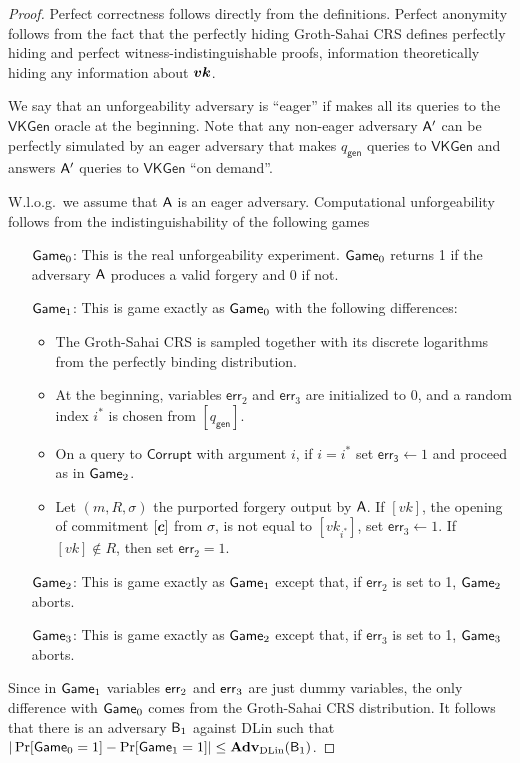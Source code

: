 \begin{proof}
Perfect correctness follows directly from the definitions. Perfect anonymity follows from the fact that the perfectly hiding Groth-Sahai CRS defines perfectly hiding and perfect witness-indistinguishable proofs, information theoretically hiding any information about ${\boldsymbol{vk}}$.

We say that an unforgeability adversary is ``eager'' if  makes all its queries to the $\mathsf{VKGen}$ oracle at the beginning. Note that any non-eager adversary $\mathsf{A}'$ can be perfectly simulated  by an eager adversary that makes ${q_\mathsf{gen}}$ queries to $\mathsf{VKGen}$ and answers $\mathsf{A}'$ queries to $\mathsf{VKGen}$ ``on demand''.

W.l.o.g.~we assume that $\mathsf{A}$ is an eager adversary. Computational unforgeability follows from the indistinguishability of the following games
\begin{itemize}
\item[$\mathsf{Game}_0$:] This is the real unforgeability experiment. $\mathsf{Game}_0$ returns 1 if the adversary $\mathsf{A}$ produces a valid forgery and 0 if not.
\item[$\mathsf{Game}_1$:] This is game exactly as $\mathsf{Game}_0$ with the following differences: 
    \begin{itemize}
    \item The Groth-Sahai CRS is sampled together with its discrete logarithms from the perfectly binding distribution.
    \item At the beginning, variables $\mathsf{err}_2$ and $\mathsf{err}_3$ are initialized to $0$, and a random index $i^*$ is chosen from $[{q_\mathsf{gen}}]$.
    \item On a query to $\mathsf{Corrupt}$ with argument $i$, if $i=i^*$ set $\mathsf{err_3}\gets 1$ and proceed as in $\mathsf{Game}_2$.
    \item Let $(m,R,\sigma)$ the purported forgery output by $\mathsf{A}$. If $[vk]$, the opening of commitment $[{\boldsymbol{c}}]$ from $\sigma$, is not equal to $[vk_{i^*}]$,  set $\mathsf{err}_3\gets 1$. If $[vk]\notin R$, then set $\mathsf{err}_2=1$.
    \end{itemize}
\item[$\mathsf{Game}_2$:] This is game exactly as $\mathsf{Game}_1$ except that, if $\mathsf{err}_2$ is set to 1, $\mathsf{Game}_2$ aborts.
\item[$\mathsf{Game}_3$:] This is game exactly as $\mathsf{Game}_2$ except that, if $\mathsf{err}_3$ is set to 1, $\mathsf{Game}_3$ aborts. 
\end{itemize}
Since in $\mathsf{Game}_1$ variables $\mathsf{err}_2$ and $\mathsf{err}_3$ are just dummy variables, the only difference with $\mathsf{Game}_0$ comes from the Groth-Sahai CRS distribution. It follows that there is an adversary $\mathsf{B}_{1}$ against DLin such that $|\Pr[\mathsf{Game}_0=1]-\Pr[\mathsf{Game}_1=1]|\leq \mathbf{Adv}_{\mathrm{DLin}}(\mathsf{B}_{1})$.


\end{proof}
